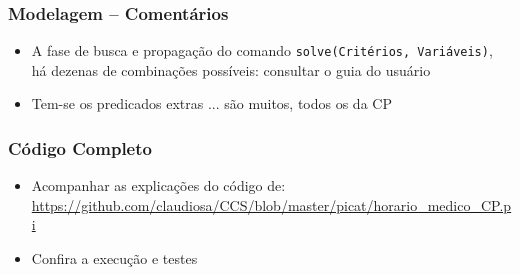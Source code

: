 \documentclass{beamer}
\begin{document}
\begin{frame}[fragile] 

\frametitle{Modelagem -- Comentários}

\begin{itemize}
  \item A fase de busca e propagação do comando 	\texttt{solve(Critérios, Variáveis)}, 
  há dezenas de combinações possíveis: consultar o guia do usuário
  
  
  \item Tem-se os predicados extras ... são muitos, todos os da CP

  
\end{itemize}

\end{frame}


\begin{frame}[fragile]
 \frametitle{Código Completo}

\begin{itemize}
  \item Acompanhar as explicações do código de:\\
\url{https://github.com/claudiosa/CCS/blob/master/picat/horario_medico_CP.pi}

  \item Confira a execução e testes
\end{itemize}
\end{frame}
\end{document}
